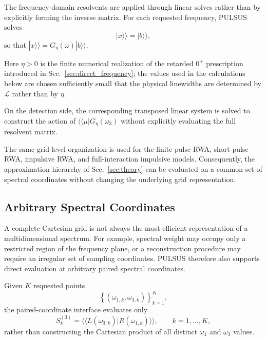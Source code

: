 The frequency-domain resolvents are applied through
linear solves rather than by explicitly forming the inverse
matrix. For each requested frequency, PULSUS solves
%
\begin{equation}
[(\eta-i\omega)I-\mathcal{L}]|x\rangle\rangle
=
|b\rangle\rangle,
\label{eq:software_resolvent_solve}
\end{equation}
%
so that
$|x\rangle\rangle=G_{\eta}(\omega)|b\rangle\rangle$.

Here $\eta>0$ is the finite numerical realization of the
retarded $0^{+}$ prescription introduced in Sec.~\ref{sec:direct_frequency};
the values used in the calculations below are chosen sufficiently small
that the physical linewidths are determined by $\mathcal{L}$ rather
than by $\eta$.

On the detection side, the corresponding transposed linear system is
solved to construct the action of
$\langle\langle\mu|G_{\eta}(\omega_3)$ without explicitly evaluating
the full resolvent matrix.

The same grid-level organization is used for the finite-pulse RWA,
short-pulse RWA, impulsive RWA, and full-interaction impulsive models.
Consequently, the approximation hierarchy of
Sec.~\ref{sec:theory} can be evaluated on a common set of spectral
coordinates without changing the underlying grid representation.

\subsection{Arbitrary Spectral Coordinates}
\label{sec:software_points}

A complete Cartesian grid is not always the most efficient
representation of a multidimensional spectrum.
For example, spectral weight may occupy only a restricted region of the
frequency plane, or a reconstruction procedure may require an
irregular set of sampling coordinates.
PULSUS therefore also supports direct evaluation at arbitrary paired
spectral coordinates.

Given $K$ requested points
%
\begin{equation}
\left\{
(\omega_{1,k},\omega_{3,k})
\right\}_{k=1}^{K},
\end{equation}
%
the paired-coordinate interface evaluates only
%
\begin{equation}
S_k^{(3)}
=
\langle\langle
L(\omega_{3,k})
|
R(\omega_{1,k})
\rangle\rangle ,
\qquad
k=1,\ldots,K,
\label{eq:software_points}
\end{equation}
%
rather than constructing the Cartesian product of all distinct
$\omega_1$ and $\omega_3$ values.

